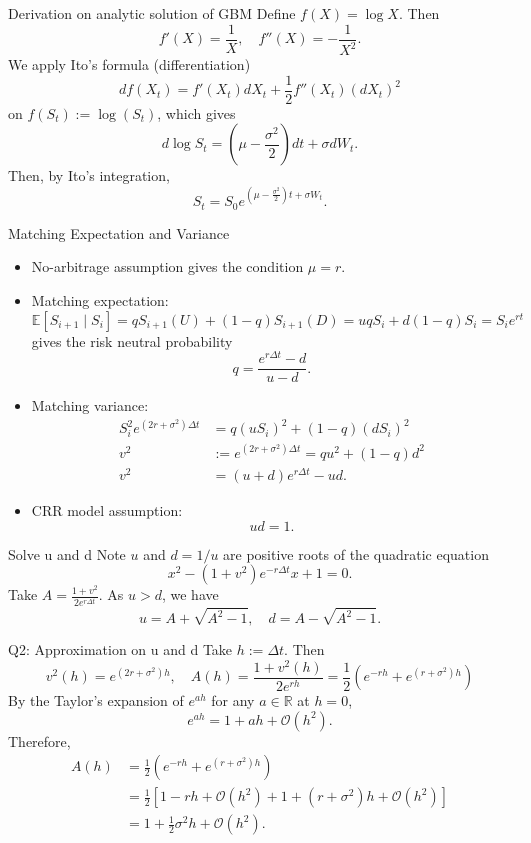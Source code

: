 \documentclass{beamer}
\newcommand{\bE}{\mathbb{E}}
\begin{document}
\begin{frame}{Derivation on analytic solution of GBM}
Define $f(X) = \log X$. Then
\[
f'(X) = \frac{1}{X}, \quad f''(X) = -\frac{1}{X^2}.
\]
We apply Ito's formula (differentiation)
\[
df(X_t) = f'(X_t) dX_t + \frac{1}{2} f''(X_t) (dX_t)^2
\]
on $f(S_t):=\log(S_t)$, which gives
\[
d\log S_t = (\mu -\frac{\sigma^2}{2})dt + \sigma dW_t.
\]
Then, by Ito's integration,
\[
S_t = S_0 e^{(\mu-\frac{\sigma^2}{2})t + \sigma W_t}.
\]
\end{frame}
\begin{frame}{Matching Expectation and Variance}

\begin{itemize}
    \item No-arbitrage assumption gives the condition $\mu=r$. 
    \item Matching expectation:
    \[
    \bE[S_{i+1}\mid S_i] = q  S_{i+1}(U)  + (1-q)S_{i+1}(D) = uqS_i + d(1-q) S_i = S_i e ^{r t}
    \]
    gives the risk neutral probability
    \[
    q = \frac{e^{r \Delta t} - d}{u - d}.
    \]
    \item  Matching variance:
    \begin{align*}
        S_i^2 e^{(2r +\sigma^2)\Delta t} &= q(uS_i)^2 + (1-q)(d S_i)^2\\
        v^2 &:= e^{(2r +\sigma^2)\Delta t} = qu^2 + (1-q)d^2\\
        v^2 &= (u+d) e^{r\Delta t} - ud.
    \end{align*}
    \item CRR model assumption:
    \[
    \boxed{ud = 1.}
    \]
\end{itemize}
\end{frame}

\begin{frame}{Solve u and d}
Note $u$ and $d=1/u$ are positive roots of the quadratic equation
\[
x^2 - (1+v^2)e^{-r\Delta t} x + 1=0.
\]
Take $A=\frac{1+v^2}{2e^{r\Delta t}}$. As $u > d$, we have
\[
u = A + \sqrt{ A^2 -1 }, \quad d = A - \sqrt{A^2 -1}. 
\]
\end{frame}

\begin{frame}{Q2: Approximation on u and d}
Take $h:=\Delta t$. Then
\[
v^2(h)=e^{(2r +\sigma^2)h}, \quad A(h) = \frac{1+v^2(h)}{2e^{rh}}=\frac{1}{2}(e^{-rh} + e^{(r+\sigma^2)h})
\]
By the Taylor's expansion of $e^{ah}$ for any $a\in \mathbb{R}$ at $h=0$,
\[
e^{ah} = 1 + ah + \mathcal{O}(h^2).
\]
Therefore,
\[
\begin{aligned}
A(h)
&=
\frac12\left(e^{-rh}+e^{(r+\sigma^2)h}\right)\\
&=
\frac12\left[
1-rh+\mathcal{O}(h^2)
+
1+(r+\sigma^2)h+\mathcal{O}(h^2)
\right]\\
&=
1+\frac12\sigma^2h+\mathcal{O}(h^2).
\end{aligned}
\]
\end{frame}
\end{document}
